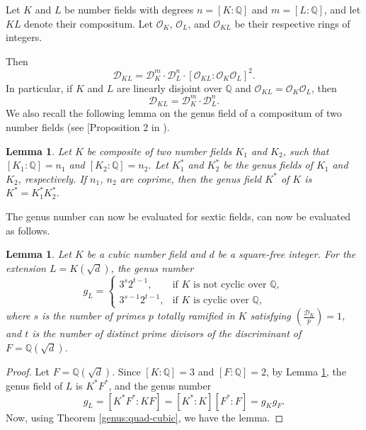 \documentclass[11pt,reqno]{amsart}
\newcommand{\cD}{\mathcal{D}}
\newtheorem{lemma}[theorem]{Lemma}
\theoremstyle{definition}
\theoremstyle{remark}
\begin{document}
Let $ K $ and $ L $ be number fields with degrees $ n = [K:\mathbb{Q}] $ and $ m = [L:\mathbb{Q}] $, and let $ KL $ denote their compositum. Let $ \mathcal{O}_K $, $ \mathcal{O}_L $, and $ \mathcal{O}_{KL} $ be their respective rings of integers.

Then
\[
\cD_{KL} = \cD_K^{m} \cdot \cD_L^{n} \cdot \left[\mathcal{O}_{KL} : \mathcal{O}_K \mathcal{O}_L \right]^2.
\]
In particular, if $ K $ and $ L $ are linearly disjoint over $ \mathbb{Q} $ and $ \mathcal{O}_{KL} = \mathcal{O}_K \mathcal{O}_L $, then
\begin{equation}\label{compositum:disc}
    \cD_{KL} = \cD_K^{m} \cdot \cD_L^{n}.
\end{equation}
We also recall the following lemma on the genus field of a compositum of two number fields (see [Proposition 2 in \cite{Ishidabook}).
\begin{lemma}\label{compositum:genusfields}
Let $K$ be composite of   two number fields  $K_1$ and $K_2$, such that $[K_1 : \mathbb{Q}] = n_1$ and $[K_2 : \mathbb{Q}] = n_2$. Let $K_1^*$ and $K_2^*$ be the genus fields of $K_1$ and $K_2$, respectively.  If $n_1$, $n_2$ are coprime,   then the genus field $K^*$ of $K$ is $
K^* = K_1^*K_2^*$.
\end{lemma}
\noindent
The genus number can now be evaluated for sextic fields, can now be evaluated as follows.
\begin{lemma}\label{genusnumber:sixdegree}
Let $K$ be a cubic number field and $d$ be a square-free integer. For the extension $L = K(\sqrt{d})$, the genus number
\[
g_L =  
\begin{cases}  
3^s 2^{t-1}, & \text{if $K$ is not cyclic over $\mathbb{Q}$}, \\  
3^{s-1} 2^{t-1}, & \text{if $K$ is cyclic over $\mathbb{Q}$},  
\end{cases}  
\]  
where $s$ is the number of primes $p$ totally ramified in $K$ satisfying $\left( \frac{\cD_K}{p} \right) = 1$, and $t$ is the number of distinct prime divisors of the discriminant of $F = \mathbb{Q}\left(\sqrt{d}\right)$.  
\end{lemma}  

\begin{proof}  
Let $F = \mathbb{Q}\left(\sqrt{d}\right)$. Since $[K : \mathbb{Q}] = 3$ 
and $[F : \mathbb{Q}] = 2$, by  Lemma \ref{compositum:genusfields}, 
the genus field of $L$ is $K^* F^*$, and the genus number  
$$
g_L = [K^* F^* : KF] = [K^* : K][F^* : F]=g_Kg_F.  
$$  
Now, using Theorem \ref{genus:quad-cubic}, we have the lemma.
\end{proof}
\end{document}

